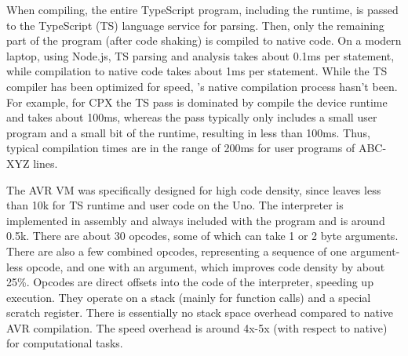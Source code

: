 When compiling, the entire TypeScript program, including the runtime, is
passed to the TypeScript (TS) language service for parsing. Then, only the remaining
part of the program (after code shaking) is compiled to native code.
On a modern laptop, using Node.js, TS parsing and analysis takes about 0.1ms per statement,
while \MC compilation to native code takes about 1ms per statement.
While the TS compiler has been optimized for speed,
\MCN's native compilation process hasn't been.
For example, for CPX the TS pass is dominated by compile the device runtime
and takes about 100ms, whereas the \MC pass typically only includes a small user program
and a small bit of the runtime, resulting in less than 100ms.
Thus, typical compilation times are in the range of 200ms for user programs
of ABC-XYZ lines.

The AVR VM was specifically designed for high code density, since \CO
leaves less than 10k for TS runtime and user code on the Uno.
The interpreter is implemented in assembly and always included with the program and is around 0.5k.
There are about 30 opcodes, some of which can take 1 or 2 byte arguments.
There are also a few combined opcodes, representing a sequence of one argument-less opcode,
and one with an argument, which improves code density by about 25\%.
Opcodes are direct offsets into the code of the interpreter, speeding up execution.
They operate on a stack (mainly for function calls) and a special scratch register.
There is essentially no stack space overhead compared to native AVR compilation.
The speed overhead is around 4x-5x (with respect to native) for computational tasks.



